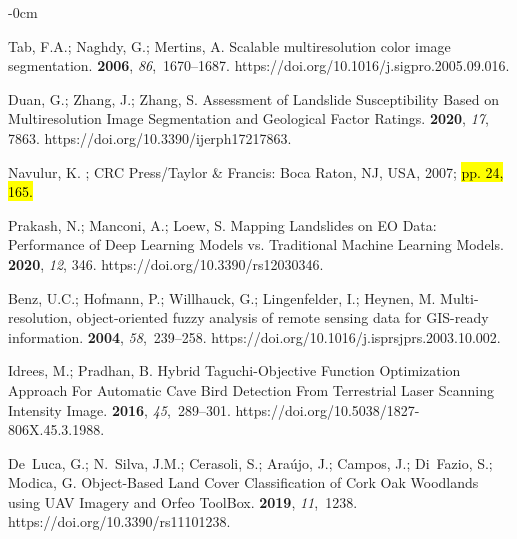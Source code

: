 \documentclass[remotesensing,article,accept,pdftex,moreauthors]{Definitions/mdpi}
\begin{document}
\begin{adjustwidth}{-\extralength}{0cm}
\begin{thebibliography}{999}
Tab, F.A.; Naghdy, G.; Mertins, A.
\newblock Scalable multiresolution color image segmentation.
 {\bf 2006}, {\em 86},~1670--1687.
\newblock https://doi.org/10.1016/j.sigpro.2005.09.016.

Duan, G.; Zhang, J.; Zhang, S.
\newblock Assessment of Landslide Susceptibility Based on Multiresolution Image
  Segmentation and Geological Factor Ratings.
 {\bf 2020}, {\em 17}, {7863}.
\newblock https://doi.org/10.3390/ijerph17217863.

Navulur, K.
; CRC Press/Taylor \& Francis: Boca Raton, NJ, USA, 2007; \hl{pp. 24, 165.} %


Prakash, N.; Manconi, A.; Loew, S.
\newblock Mapping Landslides on EO Data: Performance of Deep Learning Models
  vs. Traditional Machine Learning Models.
 {\bf 2020}, {\em 12}, {346}.
\newblock https://doi.org/10.3390/rs12030346.

Benz, U.C.; Hofmann, P.; Willhauck, G.; Lingenfelder, I.; Heynen, M.
\newblock Multi-resolution, object-oriented fuzzy analysis of remote sensing
  data for GIS-ready information.
 {\bf 2004},
  {\em 58},~239--258. \linebreak https://doi.org/10.1016/j.isprsjprs.2003.10.002.

Idrees, M.; Pradhan, B.
\newblock Hybrid Taguchi-Objective Function Optimization Approach For Automatic
  Cave Bird Detection From Terrestrial Laser Scanning Intensity Image.
 {\bf 2016}, {\em
  45},~289--301.
\newblock https://doi.org/10.5038/1827-806X.45.3.1988.

De~Luca, G.; N.~Silva, J.M.; Cerasoli, S.; Araújo, J.; Campos, J.; Di~Fazio,
  S.; Modica, G.
\newblock Object-Based Land Cover Classification of Cork Oak Woodlands using
  UAV Imagery and Orfeo ToolBox.
 {\bf 2019}, {\em 11},~1238.
\newblock https://doi.org/10.3390/rs11101238.


\end{thebibliography}
\end{adjustwidth}
\end{document}
